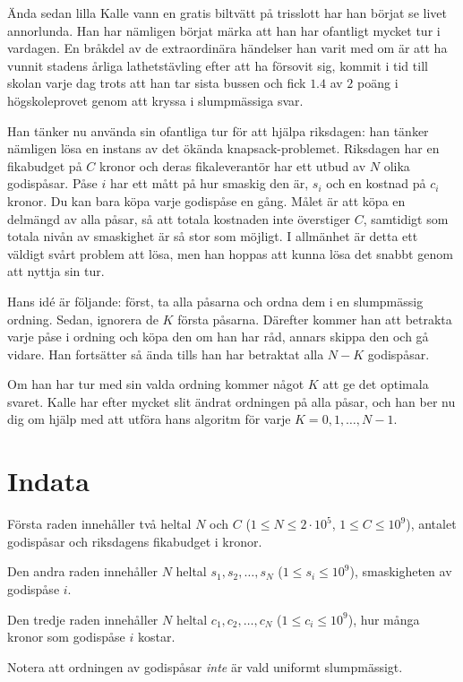 \noindent

Ända sedan lilla Kalle vann en gratis biltvätt på trisslott har han börjat se livet annorlunda.
Han har nämligen börjat märka att han har ofantligt mycket tur i vardagen.
En bråkdel av de extraordinära händelser han varit med om är att ha vunnit stadens årliga lathetstävling
efter att ha försovit sig, kommit i tid till skolan varje dag trots att han tar
sista bussen och fick $1.4$ av $2$ poäng i högskoleprovet genom att kryssa i slumpmässiga svar.

Han tänker nu använda sin ofantliga tur för att hjälpa riksdagen: han tänker nämligen lösa en instans
av det ökända knapsack-problemet. Riksdagen har en fikabudget på $C$ kronor och deras fikaleverantör
har ett utbud av $N$ olika godispåsar. Påse $i$ har ett mått på hur smaskig den är,
$s_i$ och en kostnad på $c_i$ kronor. Du kan bara köpa varje godispåse en gång. 
Målet är att köpa en delmängd av alla påsar, så att totala kostnaden inte överstiger $C$, samtidigt som
totala nivån av smaskighet är så stor som möjligt. I allmänhet är detta ett väldigt svårt problem att lösa,
men han hoppas att kunna lösa det snabbt genom att nyttja sin tur. 

Hans idé är följande: först, ta alla påsarna och ordna dem i en slumpmässig ordning. Sedan, ignorera
de $K$ första påsarna. Därefter kommer han att betrakta varje påse i ordning och köpa den om han har
råd, annars skippa den och gå vidare. Han fortsätter så ända tills han har betraktat alla $N-K$
godispåsar. 

Om han har tur med sin valda ordning kommer något $K$ att ge det optimala svaret. Kalle har efter mycket slit
ändrat ordningen på alla påsar, och han ber nu dig om hjälp med att utföra hans algoritm för varje $K=0,1,\dots,N-1$.

\section*{Indata}
Första raden innehåller två heltal $N$ och $C$ ($1 \leq N \leq 2 \cdot 10^5$, $1 \leq C \leq 10^9$), antalet godispåsar 
och riksdagens fikabudget i kronor.

Den andra raden innehåller $N$ heltal $s_1, s_2, \dots, s_N$ ($1 \leq s_i \leq 10^9$), smaskigheten av godispåse $i$.

Den tredje raden innehåller $N$ heltal $c_1, c_2, \dots, c_N$ ($1 \leq c_i \leq 10^9$), hur många kronor som godispåse $i$
kostar.

Notera att ordningen av godispåsar \textit{inte} är vald uniformt slumpmässigt. 


